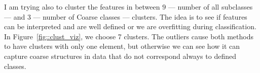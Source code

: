 \documentclass[../main.tex]{subfile}
\begin{document}
    I am trying also to cluster the features in between $9$ --- number of all subclasses --- and $3$ --- number of Coarse classes --- clusters. The idea is to see if features can be interpreted and are well defined or we are overfitting during classification. In Figure~\ref{fig::clust_viz}, we choose 7 clusters. The outliers cause both methods to have clusters with only one element, but otherwise we can see how it can capture coarse structures in data that do not correspond always to defined classes.

    \begin{figure}[H]
\end{figure}
\end{document}
